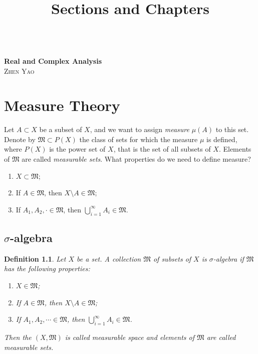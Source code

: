 \documentclass[11pt]{book}
\title{Sections and Chapters}
\newtheorem{definition}{Definition}[chapter]
\theoremstyle{definition}
\numberwithin{equation}{chapter}
\def\MM{\mathfrak{M}}
\begin{document}
\frontmatter

\begin{titlepage}
	\begin{center}
	\textbf{\LARGE{}} \\
	\vspace{40mm}
    \textbf{\Huge{Real and Complex Analysis}} \\
    \medskip
    \vspace{10mm} %
    \large{\textsc{Zhen Yao}}\\
    \end{center}
\end{titlepage}

\tableofcontents{}
\mainmatter

\newpage

\chapter{Measure Theory}

Let $A \subset X$ be a subset of $X$, and we want to assign {\em measure} $\mu(A)$ to this set. Denote by $\MM \subset P(X)$ the class of sets for which the measure $\mu$ is defined, where $P(X)$ is the power set of $X$, that is the set of all subsets of $X$. Elements of $\MM$ are called {\em measurable sets}. What properties do we need to define measure?
\begin{enumerate}[label=(\alph*)]
    \item $X \subset \MM$;
    
    \item If $A \in \MM$, then $X \setminus A \in \MM$;
    
    \item If $A_1, A_2, \cdot \in \MM$, then $\bigcup^\infty_{i=1}A_i \in \MM$.
\end{enumerate}

\medskip

\section{$\sigma$-algebra}

\begin{definition}\label{definition_11}
Let $X$ be a set. A collection $\MM$ of subsets of $X$ is $\sigma$-algebra if $\MM$ has the following properties:
\begin{enumerate}[label=(\alph*)]
    \item $X \in \MM$;
    
    \item If $A \in \MM$, then $X \setminus A \in \MM$;
    
    \item If $A_1, A_2, \cdots \in \MM$, then $\bigcup^\infty_{i=1}A_i \in \MM$.
\end{enumerate}
Then the $(X,\MM)$ is called measurable space and elements of $\MM$ are called measurable sets.
\end{definition}
\end{document}
